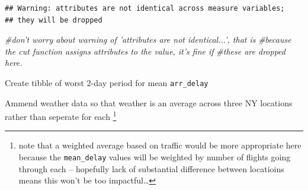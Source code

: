 \documentclass[]{book}
\newenvironment{Shaded}{\begin{snugshade}}{\end{snugshade}}
\newcommand{\CommentTok}[1]{\textcolor[rgb]{0.56,0.35,0.01}{\textit{#1}}}
\newcommand{\DataTypeTok}[1]{\textcolor[rgb]{0.13,0.29,0.53}{#1}}
\newcommand{\DecValTok}[1]{\textcolor[rgb]{0.00,0.00,0.81}{#1}}
\newcommand{\KeywordTok}[1]{\textcolor[rgb]{0.13,0.29,0.53}{\textbf{#1}}}
\newcommand{\NormalTok}[1]{#1}
\newcommand{\OperatorTok}[1]{\textcolor[rgb]{0.81,0.36,0.00}{\textbf{#1}}}
\newcommand{\StringTok}[1]{\textcolor[rgb]{0.31,0.60,0.02}{#1}}
\let\rmarkdownfootnote\footnote%
\def\footnote{\protect\rmarkdownfootnote}
\theoremstyle{definition}
\theoremstyle{definition}
\theoremstyle{definition}
\theoremstyle{remark}
\begin{document}
\begin{enumerate}
\begin{verbatim}
## Warning: attributes are not identical across measure variables;
## they will be dropped
\end{verbatim}

\begin{Shaded}
\begin{Highlighting}[]
\CommentTok{#don't worry about warning of 'attributes are not identical...', that is}
\CommentTok{#because the cut function assigns attributes to the value, it's fine if}
\CommentTok{#these are dropped here.}
\end{Highlighting}
\end{Shaded}

  Create tibble of worst 2-day period for mean \texttt{arr\_delay}

\begin{Shaded}
\end{Shaded}

  Ammend weather data so that weather is an average across three NY
  locations rather than seperate for each \footnote{note that a weighted
    average based on traffic would be more appropriate here because the
    \texttt{mean\_delay} values will be weighted by number of flights
    going through each -- hopefully lack of substantial difference
    between locatioins means this won't be too impactful\ldots{}}


\end{enumerate}
\end{document}
